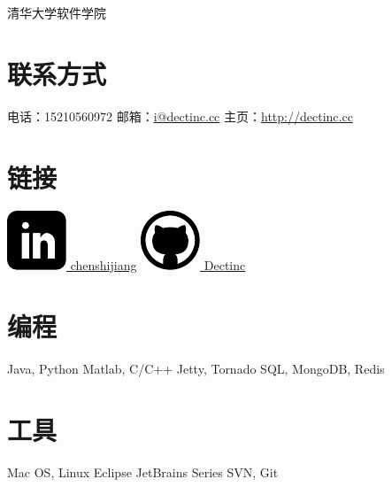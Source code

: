 \documentclass[]{friggeri-cv}
\begin{document}
       {清华大学软件学院}

\begin{aside}
  \section{联系方式}
    电话：15210560972
    邮箱：\href{mailto:i@dectinc.cc}{i@dectinc.cc}
    主页：\href{http://dectinc.cc}{http://dectinc.cc}
  \section{链接}
    \href{http://www.linkedin.com/in/chenshijiang}{\includegraphics[width=.8em]{icons/linkedin.pdf} chenshijiang}
    \href{https://github.com/Dectinc}{\includegraphics[width=.9em]{icons/github.pdf} Dectinc}
  \section{编程}
    Java, Python
    Matlab, C/C++
    Jetty, Tornado
    SQL, MongoDB, Redis
  \section{工具}
    Mac OS, Linux
    Eclipse
    JetBrains Series
    SVN, Git
\end{aside}

\end{document}
